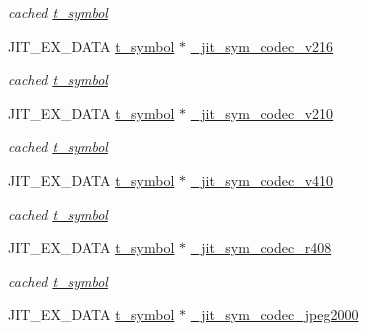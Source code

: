 \begin{DoxyCompactItemize}
\begin{DoxyCompactList}\small\item\em cached \hyperlink{structt__symbol}{t\_\-symbol} \item\end{DoxyCompactList}\item 
\hypertarget{group__jitter_ga1e4352592fd06bea6b10a4c9784f6380}{
JIT\_\-EX\_\-DATA \hyperlink{structt__symbol}{t\_\-symbol} $\ast$ \hyperlink{group__jitter_ga1e4352592fd06bea6b10a4c9784f6380}{\_\-jit\_\-sym\_\-codec\_\-v216}}
\label{group__jitter_ga1e4352592fd06bea6b10a4c9784f6380}

\begin{DoxyCompactList}\small\item\em cached \hyperlink{structt__symbol}{t\_\-symbol} \item\end{DoxyCompactList}\item 
\hypertarget{group__jitter_ga4f705bd3a47a745ac81e8655feefb053}{
JIT\_\-EX\_\-DATA \hyperlink{structt__symbol}{t\_\-symbol} $\ast$ \hyperlink{group__jitter_ga4f705bd3a47a745ac81e8655feefb053}{\_\-jit\_\-sym\_\-codec\_\-v210}}
\label{group__jitter_ga4f705bd3a47a745ac81e8655feefb053}

\begin{DoxyCompactList}\small\item\em cached \hyperlink{structt__symbol}{t\_\-symbol} \item\end{DoxyCompactList}\item 
\hypertarget{group__jitter_ga450940b2992dcad6161d84512cd27c30}{
JIT\_\-EX\_\-DATA \hyperlink{structt__symbol}{t\_\-symbol} $\ast$ \hyperlink{group__jitter_ga450940b2992dcad6161d84512cd27c30}{\_\-jit\_\-sym\_\-codec\_\-v410}}
\label{group__jitter_ga450940b2992dcad6161d84512cd27c30}

\begin{DoxyCompactList}\small\item\em cached \hyperlink{structt__symbol}{t\_\-symbol} \item\end{DoxyCompactList}\item 
\hypertarget{group__jitter_gac0447dbeb9c9530cd0dd6216f94f1c61}{
JIT\_\-EX\_\-DATA \hyperlink{structt__symbol}{t\_\-symbol} $\ast$ \hyperlink{group__jitter_gac0447dbeb9c9530cd0dd6216f94f1c61}{\_\-jit\_\-sym\_\-codec\_\-r408}}
\label{group__jitter_gac0447dbeb9c9530cd0dd6216f94f1c61}

\begin{DoxyCompactList}\small\item\em cached \hyperlink{structt__symbol}{t\_\-symbol} \item\end{DoxyCompactList}\item 
\hypertarget{group__jitter_ga4f5c3b3746bbc22ff0975bbf4b6f9170}{
JIT\_\-EX\_\-DATA \hyperlink{structt__symbol}{t\_\-symbol} $\ast$ \hyperlink{group__jitter_ga4f5c3b3746bbc22ff0975bbf4b6f9170}{\_\-jit\_\-sym\_\-codec\_\-jpeg2000}}
\label{group__jitter_ga4f5c3b3746bbc22ff0975bbf4b6f9170}


\end{DoxyCompactItemize}
